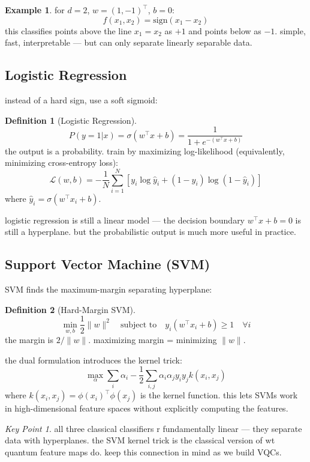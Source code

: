 \documentclass[11pt,a4paper]{article}
\theoremstyle{definition}
\newtheorem{definition}{Definition}[section]
\newtheorem{example}{Example}[section]
\theoremstyle{remark}
\newtheorem*{keypoint}{Key Point}
\begin{document}
\begin{example}
for $d = 2$, $w = (1, -1)^\top$, $b = 0$:
\[
f(x_1, x_2) = \text{sign}(x_1 - x_2)
\]
this classifies points above the line $x_1 = x_2$ as $+1$ and points below as $-1$. simple, fast, interpretable --- but can only separate linearly separable data.
\end{example}

\subsection{Logistic Regression}

instead of a hard sign, use a soft sigmoid:

\begin{definition}[Logistic Regression]
\[
P(y = 1 | x) = \sigma(w^\top x + b) = \frac{1}{1 + e^{-(w^\top x + b)}}
\]
the output is a probability. train by maximizing log-likelihood (equivalently, minimizing cross-entropy loss):
\[
\mathcal{L}(w, b) = -\frac{1}{N}\sum_{i=1}^N \left[y_i \log \hat{y}_i + (1 - y_i)\log(1 - \hat{y}_i)\right]
\]
where $\hat{y}_i = \sigma(w^\top x_i + b)$.
\end{definition}

logistic regression is still a linear model --- the decision boundary $w^\top x + b = 0$ is still a hyperplane. but the probabilistic output is much more useful in practice.

\subsection{Support Vector Machine (SVM)}

SVM finds the maximum-margin separating hyperplane:

\begin{definition}[Hard-Margin SVM]
\[
\min_{w, b} \frac{1}{2}\|w\|^2 \quad \text{subject to} \quad y_i(w^\top x_i + b) \geq 1 \quad \forall i
\]
the margin is $2/\|w\|$. maximizing margin = minimizing $\|w\|$.
\end{definition}

the dual formulation introduces the kernel trick:
\[
\max_\alpha \sum_i \alpha_i - \frac{1}{2}\sum_{i,j} \alpha_i \alpha_j y_i y_j k(x_i, x_j)
\]
where $k(x_i, x_j) = \phi(x_i)^\top \phi(x_j)$ is the kernel function. this lets SVMs work in high-dimensional feature spaces without explicitly computing the features.

\begin{keypoint}
all three classical classifiers r fundamentally linear --- they separate data with hyperplanes. the SVM kernel trick is the classical version of wt quantum feature maps do. keep this connection in mind as we build VQCs.
\end{keypoint}
\end{document}
